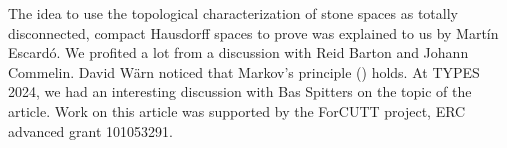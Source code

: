The idea to use the topological characterization of stone spaces as totally disconnected, compact Hausdorff spaces to prove  was explained to us by Martín Escardó.
We profited a lot from a discussion with Reid Barton and Johann Commelin. 
David Wärn noticed that Markov's principle () holds. 
At TYPES 2024, we had an interesting discussion with Bas Spitters on the topic of the article.
Work on this article was supported by the ForCUTT project, ERC advanced grant 101053291.
